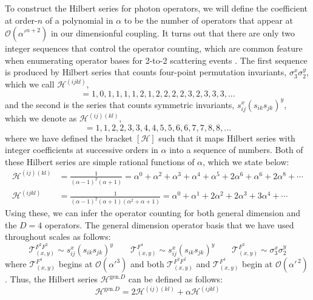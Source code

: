 \documentclass[11pt,letter]{article}
\begin{document}
To construct the Hilbert series for photon operators, we will define the coefficient at order-$n$ of a polynomial in $\alpha$ to be the number of operators that appear at $\mathcal{O}(\alpha'^{n+2})$ in our dimensionful coupling. It turns out that there are only two integer sequences that control the operator counting, which are common feature when enumerating operator bases for 2-to-2 scattering events \cite{Damgaard:2019lfh,Haddad:2020que,Bern:2020uwk,Balkin:2021dko,Liu:2023jbq,Haddad:2023ylx}. The first sequence is produced by Hilbert series that counts four-point {permutation invariants}, $\sigma_3^x \sigma_2^y$, which we call $\mathcal{H}^{(ijkl)}$, 
\begin{equation}
[\mathcal{H}^{(ijkl)}] = 1,0,1,1,1,1,2,1,2,2,2,2,3,2,3,3,3,...
\end{equation}
and the second is the series that counts {symmetric invariants}, $s_{ij}^x(s_{ik}s_{jk})^y$, which we denote as $\mathcal{H}^{(ij)(kl)}$,
\begin{equation}
[\mathcal{H}^{(ij)(kl)}] = 1,1,2,2,3,3,4,4,5,5,6,6,7,7,8,8,...
\end{equation}
where we have defined the bracket $[\mathcal{H}]$ such that it maps Hilbert series with integer coefficients at successive orders in $\alpha$ into a sequence of numbers. Both of these Hilbert series are simple rational functions of $\alpha$, which we state below:
\begin{align}
\mathcal{H}^{(ij)(kl)} &= \frac{1}{(\alpha-1)^2(\alpha+1)} = \alpha^0+\alpha^2+\alpha^3+\alpha^4+\alpha^5+2\alpha^6+\alpha^6+2\alpha^8+\cdots
\\
\mathcal{H}^{(ijkl)} &= \frac{1}{(\alpha-1)^2(\alpha+1)(\alpha^2+\alpha+1)} = \alpha^0+\alpha^1+2\alpha^2+2\alpha^3+3\alpha^4+\cdots
\end{align}
Using these, we can infer the operator counting for both general dimension and the $D=4$ operators. The general dimension operator basis that we have used throughout scales as follows:
\begin{equation}
\mathcal{T}^{F^2F^2}_{(x,y)} \sim s_{ij}^x(s_{ik}s_{jk})^y \qquad \mathcal{T}^{F^4}_{(x,y)} \sim s_{ij}^x(s_{ik}s_{jk})^y \qquad \mathcal{T}^{F^3}_{(x,y)} \sim \sigma_3^x\sigma_2^y
\end{equation}
where $\mathcal{T}^{F^4}_{(x,y)}$ begins at $\mathcal{O}(\alpha'^3)$ and both $\mathcal{T}^{F^2F^2}_{(x,y)}$ and $\mathcal{T}^{F^4}_{(x,y)} $ begin at $\mathcal{O}(\alpha'^{\,2})$. Thus, the Hilbert series $\mathcal{H}^{\text{gen.}D}$ can be defined as follows:
\begin{equation}
\mathcal{H}^{\text{gen.}D} = 2\mathcal{H}^{(ij)(kl)} + \alpha \mathcal{H}^{(ijkl)} 
\end{equation}
\end{document}
